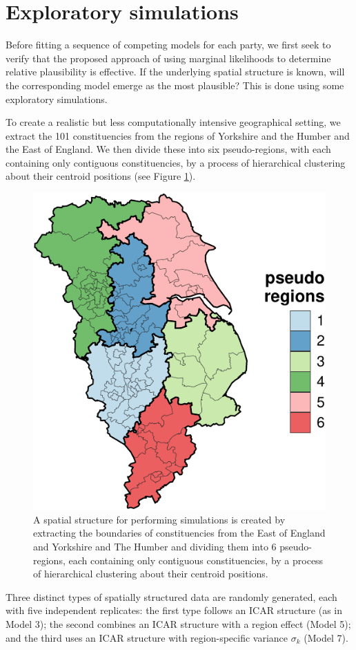 \documentclass[webpdf,large,contemporary,namedate]{oup-authoring-template}
\theoremstyle{thmstyleone}
\theoremstyle{thmstyletwo}
\theoremstyle{thmstylethree}
\begin{document}
\section{Exploratory simulations}\label{exploratory-simulations}

Before fitting a sequence of competing models for each party, we first
seek to verify that the proposed approach of using marginal likelihoods
to determine relative plausibility is effective. If the underlying
spatial structure is known, will the corresponding model emerge as the
most plausible? This is done using some exploratory simulations.

To create a realistic but less computationally intensive geographical
setting, we extract the 101 constituencies from the regions of Yorkshire
and the Humber and the East of England. We then divide these into six
pseudo-regions, with each containing only contiguous constituencies, by
a process of hierarchical clustering about their centroid positions (see
Figure \ref{fig:pseudoregions}).

\begin{figure}[th]

{\centering \includegraphics[width=0.25\linewidth]{jrss_resubmission3_files/figure-latex/pseudoregions-1} 

}

\caption{A spatial structure for performing simulations is created by extracting the boundaries of constituencies from the East of England and Yorkshire and The Humber and dividing them into 6 pseudo-regions, each containing only contiguous constituencies, by a process of hierarchical clustering about their centroid positions.}\label{fig:pseudoregions}
\end{figure}

Three distinct types of spatially structured data are randomly
generated, each with five independent replicates: the first type follows
an ICAR structure (as in Model 3); the second combines an ICAR structure
with a region effect (Model 5); and the third uses an ICAR structure
with region-specific variance \(\sigma_k\) (Model 7).
\end{document}

